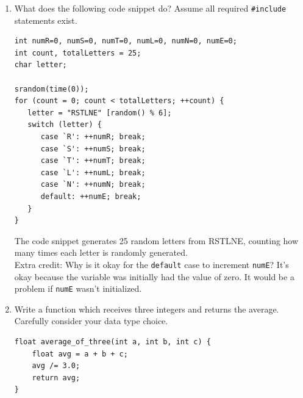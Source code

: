 \documentclass[letter,11pt]{article}
\begin{document}
\begin{enumerate}
    \item What does the following code snippet do? Assume all required \texttt{\#include} statements exist.
    \begin{verbatim}
int numR=0, numS=0, numT=0, numL=0, numN=0, numE=0;
int count, totalLetters = 25;
char letter;

srandom(time(0));
for (count = 0; count < totalLetters; ++count) {
   letter = "RSTLNE" [random() % 6];
   switch (letter) {
      case `R': ++numR; break;
      case `S': ++numS; break;
      case `T': ++numT; break;
      case `L': ++numL; break;
      case `N': ++numN; break;
      default: ++numE; break;
   }
}
    \end{verbatim}
    {\color{red}The code snippet generates 25 random letters from RSTLNE, counting how many times each letter is randomly generated.} \\
    Extra credit: Why is it okay for the \texttt{default} case to increment \texttt{numE}? {\color{red}It's okay because the variable was initially had the value of zero. It would be a problem if \texttt{numE} wasn't initialized.}
    
    \item Write a function which receives three integers and returns the average. Carefully consider your data type choice.
    \begin{verbatim}
float average_of_three(int a, int b, int c) {
    float avg = a + b + c;
    avg /= 3.0;
    return avg;
}
    \end{verbatim}
\end{enumerate}
\end{document}
